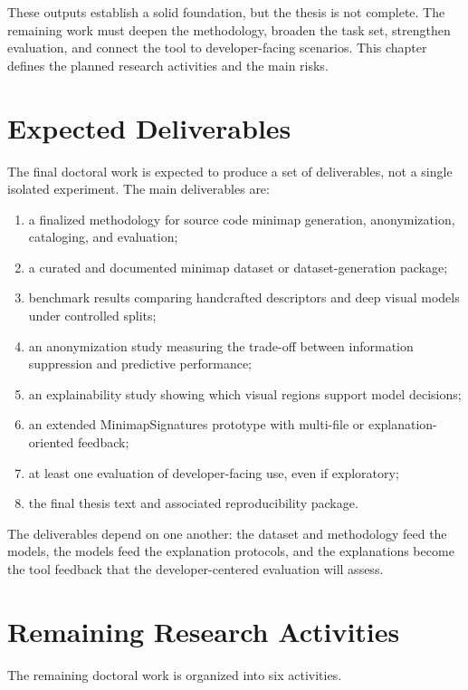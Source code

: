 These outputs establish a solid foundation, but the thesis is not complete. The
remaining work must deepen the methodology, broaden the task set, strengthen
evaluation, and connect the tool to developer-facing scenarios. This chapter
defines the planned research activities and the main risks.

\section{Expected Deliverables}

The final doctoral work is expected to produce a set of deliverables, not a
single isolated experiment. The main deliverables are:

\begin{enumerate}
    \item a finalized methodology for source code minimap generation,
    anonymization, cataloging, and evaluation;
    \item a curated and documented minimap dataset or dataset-generation package;
    \item benchmark results comparing handcrafted descriptors and deep visual
    models under controlled splits;
    \item an anonymization study measuring the trade-off between information
    suppression and predictive performance;
    \item an explainability study showing which visual regions support model
    decisions;
    \item an extended MinimapSignatures prototype with multi-file or
    explanation-oriented feedback;
    \item at least one evaluation of developer-facing use, even if exploratory;
    \item the final thesis text and associated reproducibility package.
\end{enumerate}

The deliverables depend on one another: the dataset and methodology feed the
models, the models feed the explanation protocols, and the explanations become
the tool feedback that the developer-centered evaluation will assess.

\section{Remaining Research Activities}

The remaining doctoral work is organized into six activities.

